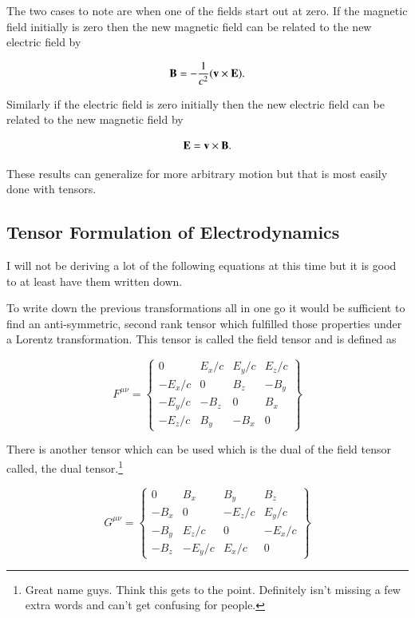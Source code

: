 \documentclass[preprint, review,12pt]{elsarticle}
\def\x{\times}
\def\b{\textbf}
\begin{document}
The two cases to note are when one of the fields start out at zero. If the magnetic field initially is zero then the new magnetic field can be related to the new electric field by

\begin{equation}
    \b B = -\frac{1}{c^2} (\b v \x \b E).
\end{equation}

Similarly if the electric field is zero initially then the new electric field can be related to the new magnetic field by

\begin{equation}
    \b E = \b v \x \b B.
\end{equation}

These results can generalize for more arbitrary motion but that is most easily done with tensors.

\subsection{Tensor Formulation of Electrodynamics}

I will not be deriving a lot of the following equations at this time but it is good to at least have them written down.

To write down the previous transformations all in one go it would be sufficient to find an anti-symmetric, second rank tensor which fulfilled those properties under a Lorentz transformation. This tensor is called the field tensor and is defined as

\begin{equation}
F^{\mu\nu} =
\begin{Bmatrix}
0 & E_x/c & E_y/c & E_z/c \\
-E_x/c & 0 & B_z & -B_y \\
-E_y/c & -B_z & 0 & B_x \\
-E_z/c & B_y & -B_x & 0
\end{Bmatrix}
\end{equation}

There is another tensor which can be used which is the dual of the field tensor called, the dual tensor.\footnote{Great name guys. Think this gets to the point. Definitely isn't missing a few extra words and can't get confusing for people.}

\begin{equation}
G^{\mu\nu} =
\begin{Bmatrix}
0 & B_x & B_y & B_z \\
-B_x & 0 & -E_z/c & E_y/c \\
-B_y & E_z/c & 0 & -E_x/c \\
-B_z & -E_y/c & E_x/c & 0
\end{Bmatrix}
\end{equation}
\end{document}
